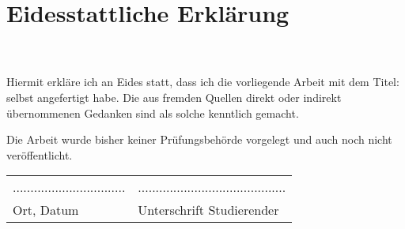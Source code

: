 \section*{Eidesstattliche Erklärung}

\ThesisAuthor \\
\ThesisAuthorAddress \\
\newline
Hiermit erkläre ich an Eides statt, dass ich die vorliegende Arbeit mit dem Titel: \glqq\ThesisTitle\grqq{} selbst angefertigt habe. Die aus fremden Quellen direkt oder indirekt übernommenen
Gedanken sind als solche kenntlich gemacht.

Die Arbeit wurde bisher keiner Prüfungsbehörde vorgelegt und auch noch nicht veröffentlicht.
\\[2cm]


\begin{tabular}{ll}
................................ & .......................................... \\ 
Ort, Datum                       & Unterschrift Studierender\\[1.5cm]

\end{tabular}